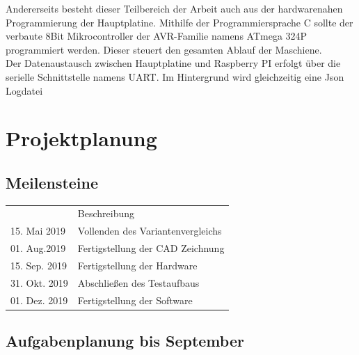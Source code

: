 Andererseits besteht dieser Teilbereich der Arbeit auch aus der hardwarenahen Programmierung der Hauptplatine. Mithilfe der Programmiersprache C sollte der verbaute 8Bit Mikrocontroller der AVR-Familie namens ATmega 324P programmiert werden.
Dieser steuert den gesamten Ablauf der Maschiene. \\

Der Datenaustausch zwischen Hauptplatine und Raspberry PI erfolgt über die serielle Schnittstelle namens UART.
Im Hintergrund wird gleichzeitig eine Json Logdatei
\chapter{Projektplanung}
\label{sec:Projektplanung}
\section{Meilensteine}
\begin{table}[h!]
    \begin{tabular}{ll}
        \hline
        \rowcolor[HTML]{C0C0C0}
        \multicolumn{2}{c}{\cellcolor[HTML]{C0C0C0}\textbf{Meilensteine}}                      \\ \hline
        \rowcolor[HTML]{EFEFEF}
        \multicolumn{1}{l|}{\cellcolor[HTML]{EFEFEF}Datum} & Beschreibung                      \\ \hline
        \multicolumn{1}{l|}{15. Mai 2019}                   & Vollenden des Variantenvergleichs \\ \hline
        \multicolumn{1}{l|}{01. Aug.2019}                    & Fertigstellung der CAD Zeichnung  \\ \hline
        \multicolumn{1}{l|}{15. Sep. 2019}                   & Fertigstellung der Hardware       \\ \hline
        \multicolumn{1}{l|}{31. Okt. 2019}                   & Abschließen des Testaufbaus       \\ \hline
        \multicolumn{1}{l|}{01. Dez. 2019}                    & Fertigstellung der Software       \\ \hline
    \end{tabular}
\end{table}

\section{Aufgabenplanung bis September}

